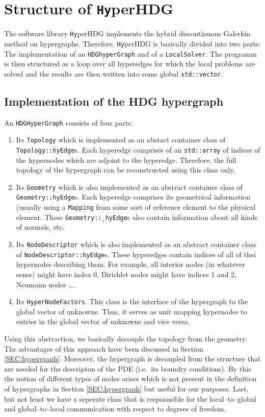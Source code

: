 \documentclass[a4paper, english, 12pt, reqno, draft]{amsart}
\theoremstyle{definition}
\theoremstyle{remark}
\numberwithin{equation}{section}
\newcommand{\hyperHDG}{{\fontfamily{pzc}\selectfont \texttt{Hy}\hspace{-1.5pt}perHDG }}
\newcommand{\code}[1]{\texttt{#1}}
\begin{document}
\section{Structure of \hyperHDG}
% 
The software library \hyperHDG implements the hybrid discontinuous Galerkin method on hypergraphs. Therefore, \hyperHDG is basically divided into two parts: The implementation of an \code{HDGhyperGraph} and of a \code{LocalSolver}. The programm is then structured as a loop over all hyperedges for which the local problems are solved and the results are then written into some global \code{std::vector}.
% 
\subsection{Implementation of the HDG hypergraph}
% 
An \code{HDG\-Hyper\-Graph} consists of four parts:
% 
\begin{enumerate}
 \item Its \code{Topology} which is implemented as an abstact container class of \code{Topology::hyEdge}s. Each hyperedge comprises of an \code{std::array} of indices of the hypernodes which are adjoint to the hyperedge. Therefore, the full topology of the hypergraph can be reconstructed using this class only.
 \item Its \code{Geometry} which is also implemented as an abstract container class of \code{Geometry::hyEdge}s. Each hyperedge comprises its geometrical information (usually using a \code{Mapping} from some sort of reference element to the physical element. These \code{Geometry::\-¸hyEdge}s also contain information about all kinds of normals, etc.
 \item Its \code{NodeDescriptor} which is also implemented as an abstract container class of \code{NodeDescriptor::hyEdge}s. These hyperedges contain indices of all of thei hypernodes describing them. For example, all interior nodes (in whatever sense) might have index 0, Dirichlet nodes might have indices 1 and 2, Neumann nodes \ldots.
 \item Its \code{HyperNodeFactors}. This class is the interface of the hypergraph to the global vector of unknowns. Thus, it serves as unit mapping hypernodes to entries in the global vector of unknowns and vice versa.
\end{enumerate}
% 
Using this abstraction, we basically decouple the topology from the geometry. The advantages of this approach have been discussed in Section \ref{SEC:hypergraph}. Moreover, the hypergraph is decoupled from the structues that are needed for the descripton of the PDE (i.e.~its boundry conditions). By this the notion of different types of nodes arises which is not present in the definition of hypergraphs in Section \ref{SEC:hypergraph} but useful for our purposes. Last, but not least we have a seperate class that is resposnsible for the local--to--global and global--to--local communication with respect to degrees of freedom.
\end{document}
